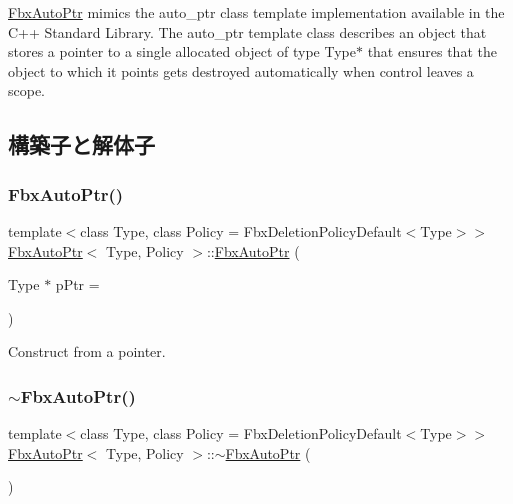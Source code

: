 \hyperlink{class_fbx_auto_ptr}{Fbx\+Auto\+Ptr} mimics the {\ttfamily auto\+\_\+ptr} class template implementation available in the C++ Standard Library. The {\ttfamily auto\+\_\+ptr} template class describes an object that stores a pointer to a single allocated object of type Type$\ast$ that ensures that the object to which it points gets destroyed automatically when control leaves a scope. 

\subsection{構築子と解体子}
\mbox{\label{class_fbx_auto_ptr_ae988d5760ee4926a4a10d76c37b378fc}} 
\subsubsection{\texorpdfstring{Fbx\+Auto\+Ptr()}{FbxAutoPtr()}}
{\footnotesize\ttfamily template$<$class Type, class Policy = Fbx\+Deletion\+Policy\+Default$<$\+Type$>$$>$ \\
\hyperlink{class_fbx_auto_ptr}{Fbx\+Auto\+Ptr}$<$ Type, Policy $>$\+::\hyperlink{class_fbx_auto_ptr}{Fbx\+Auto\+Ptr} (\begin{DoxyParamCaption}\item[{Type $\ast$}]{p\+Ptr = {} }\end{DoxyParamCaption})\hspace{0.3cm}{\ttfamily [explicit]}}



Construct from a pointer. 

\mbox{\label{class_fbx_auto_ptr_aa185a3ac9d0cc7b8c2b04825f3ea73ee}} 
\subsubsection{\texorpdfstring{$\sim$\+Fbx\+Auto\+Ptr()}{~FbxAutoPtr()}}
{\footnotesize\ttfamily template$<$class Type, class Policy = Fbx\+Deletion\+Policy\+Default$<$\+Type$>$$>$ \\
\hyperlink{class_fbx_auto_ptr}{Fbx\+Auto\+Ptr}$<$ Type, Policy $>$\+::$\sim$\hyperlink{class_fbx_auto_ptr}{Fbx\+Auto\+Ptr} (\begin{DoxyParamCaption}{ }\end{DoxyParamCaption})}



